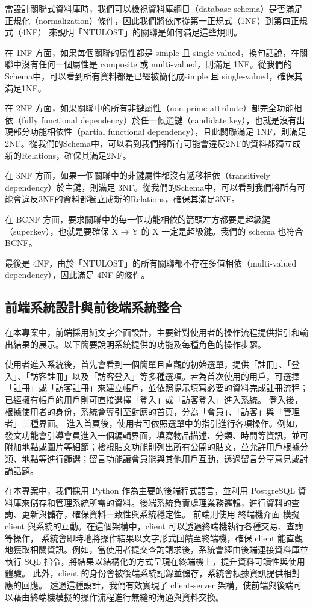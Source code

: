 \documentclass[12pt,a4paper]{article}
\begin{document}
當設計關聯式資料庫時，我們可以檢視資料庫綱目（database schema）是否滿足正規化（normalization）條件，因此我們將依序從第一正規式（1NF）到第四正規式（4NF） 來說明「NTULOST」的關聯是如何滿足這些規則。

在 1NF 方面，如果每個關聯的屬性都是 simple 且 single-valued，換句話說，在關聯中沒有任何一個屬性是 composite 或 multi-valued，則滿足 1NF。從我們的Schema中，可以看到所有資料都是已經被簡化成simple 且 single-valued，確保其滿足1NF。

在 2NF 方面，如果關聯中的所有非鍵屬性（non-prime attribute）都完全功能相依（fully functional dependency）於任一候選鍵（candidate key），也就是沒有出現部分功能相依性（partial functional dependency），且此關聯滿足 1NF，則滿足 2NF。從我們的Schema中，可以看到我們將所有可能會違反2NF的資料都獨立成新的Relations，確保其滿足2NF。

在 3NF 方面，如果一個關聯中的非鍵屬性都沒有遞移相依（transitively dependency）於主鍵，則滿足 3NF。從我們的Schema中，可以看到我們將所有可能會違反3NF的資料都獨立成新的Relations，確保其滿足3NF。

在 BCNF 方面，要求關聯中的每一個功能相依的箭頭左方都要是超級鍵（superkey），也就是要確保 X → Y 的 X 一定是超級鍵。我們的 schema 也符合 BCNF。 

最後是 4NF，由於「NTULOST」的所有關聯都不存在多值相依（multi-valued dependency），因此滿足 4NF 的條件。 


\subsection{前端系統設計與前後端系統整合}

在本專案中，前端採用純文字介面設計，主要針對使用者的操作流程提供指引和輸出結果的展示。以下簡要說明系統提供的功能及每種角色的操作步驟。

使用者進入系統後，首先會看到一個簡單且直觀的初始選單，提供「註冊」、「登入」、「訪客註冊」以及「訪客登入」等多種選項。若為首次使用的用戶，可選擇「註冊」或「訪客註冊」來建立帳戶，並依照提示填寫必要的資料完成註冊流程；已經擁有帳戶的用戶則可直接選擇「登入」或「訪客登入」進入系統。
登入後，根據使用者的身份，系統會導引至對應的首頁，分為「會員」、「訪客」與「管理者」三種界面。
進入首頁後，使用者可依照選單中的指引進行各項操作。例如，發文功能會引導會員進入一個編輯界面，填寫物品描述、分類、時間等資訊，並可附加地點或圖片等細節；檢視貼文功能則列出所有公開的貼文，並允許用戶根據分類、地點等進行篩選；留言功能讓會員能與其他用戶互動，透過留言分享意見或討論話題。


在本專案中，我們採用 Python 作為主要的後端程式語言，並利用 PostgreSQL 資料庫來儲存和管理系統所需的資料。後端系統負責處理業務邏輯，進行資料的查詢、更新與儲存，確保資料一致性與系統穩定性。
前端則使用 終端機介面 模擬 client 與系統的互動。在這個架構中，client 可以透過終端機執行各種交易、查詢等操作，
系統會即時地將操作結果以文字形式回饋至終端機，確保 client 能直觀地獲取相關資訊。例如，當使用者提交查詢請求後，系統會經由後端連接資料庫並執行 SQL 指令，將結果以結構化的方式呈現在終端機上，提升資料可讀性與使用體驗。
此外，client 的身份會被後端系統記錄並儲存，系統會根據資訊提供相對應的回應。
透過這種設計，我們有效實現了 client-server 架構，使前端與後端可以藉由終端機模擬的操作流程進行無縫的溝通與資料交換。
\end{document}
